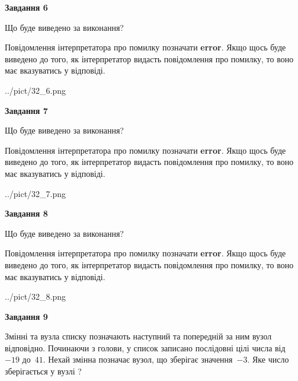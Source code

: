 \documentclass[12pt, ukrainian]{article}
\begin{document}
{\begin {large}
{\begin {center}\textbf{Завдання 6}\end {center}}\par
Що буде виведено за виконання?

Повідомлення інтерпретатора про помилку позначати \textbf{error}.
Якщо щось буде виведено до того, як інтерпретатор видасть повідомлення про помилку, 
то воно має вказуватись у відповіді. \par


\begin{center}
	{../pict/32_6.png}
\end{center}
\newpage

{\begin {center}\textbf{Завдання 7}\end {center}}\par
Що буде виведено за виконання?

Повідомлення інтерпретатора про помилку позначати \textbf{error}.
Якщо щось буде виведено до того, як інтерпретатор видасть повідомлення про помилку, 
то воно має вказуватись у відповіді. \par


\begin{center}
	{../pict/32_7.png}
\end{center}
\newpage

{\begin {center}\textbf{Завдання 8}\end {center}}\par
Що буде виведено за виконання?

Повідомлення інтерпретатора про помилку позначати \textbf{error}.
Якщо щось буде виведено до того, як інтерпретатор видасть повідомлення про помилку, 
то воно має вказуватись у відповіді. \par


\begin{center}
	{../pict/32_8.png}
\end{center}
\newpage

{\begin {center}\textbf{Завдання 9}\end {center}}\par
Змінні  та  вузла списку позначають наступний та попередній за ним вузол відповідно. Починаючи з голови, у список записано послідовні цілі числа від~$-19$ до~$41$. Нехай змінна  позначає вузол, що зберігає значення~$-3$.
Яке число зберігається у вузлі  ?\par
\newpage


\end{large}}
\end{document}

